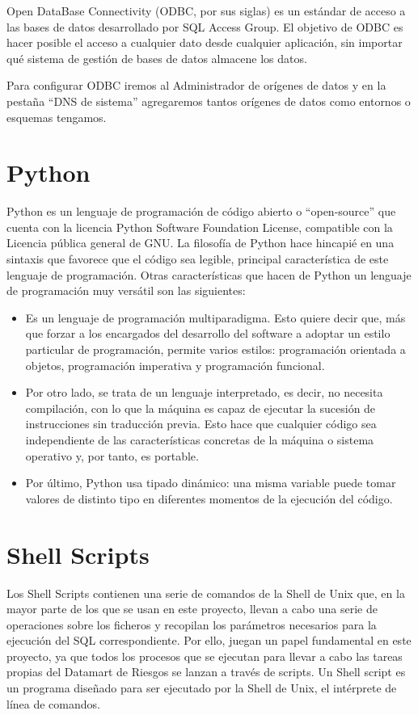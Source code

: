 \documentclass[a4paper, 12pt]{book}
\begin{document}
Open DataBase Connectivity (ODBC, por sus siglas) es un estándar de acceso a las bases de datos desarrollado por SQL Access Group. El objetivo de ODBC es hacer posible el acceso a cualquier dato desde cualquier aplicación, sin importar qué sistema de gestión de bases de datos almacene los datos.

Para configurar ODBC iremos al Administrador de orígenes de datos y en la pestaña “DNS de sistema” agregaremos tantos orígenes de datos como entornos o esquemas tengamos.

\section{Python}
\label{sec:Python}
Python es un lenguaje de programación de código abierto o “open-source” que cuenta con la licencia Python Software Foundation License, compatible con la Licencia pública general de GNU. La filosofía de Python hace hincapié en una sintaxis que favorece que el código sea legible, principal característica de este lenguaje de programación. Otras características que hacen de Python un lenguaje de programación muy versátil son las siguientes:

\begin{itemize}
	\item Es un lenguaje de programación multiparadigma. Esto quiere decir que, más que forzar a los encargados del desarrollo del software a adoptar un estilo particular de programación, permite varios estilos: programación orientada a objetos, programación imperativa y programación funcional.

	\item Por otro lado, se trata de un lenguaje interpretado, es decir, no necesita compilación, con lo que la máquina es capaz de ejecutar la sucesión de instrucciones sin traducción previa. Esto hace que cualquier código sea independiente de las características concretas de la máquina o sistema operativo y, por tanto, es portable.

	\item Por último, Python usa tipado dinámico: una misma variable puede tomar valores de distinto tipo en diferentes momentos de la ejecución del código.
\end{itemize}

\section{Shell Scripts}
\label{sec:Shell_Scripts}
Los Shell Scripts contienen una serie de comandos de la Shell de Unix que, en la mayor parte de los que se usan en este proyecto, llevan a cabo una serie de operaciones sobre los ficheros y recopilan los parámetros necesarios para la ejecución del SQL correspondiente. Por ello, juegan un papel fundamental en este proyecto, ya que todos los procesos que se ejecutan para llevar a cabo las tareas propias del Datamart de Riesgos se lanzan a través de scripts. Un Shell script es un programa diseñado para ser ejecutado por la Shell de Unix, el intérprete de línea de comandos.
\end{document}
